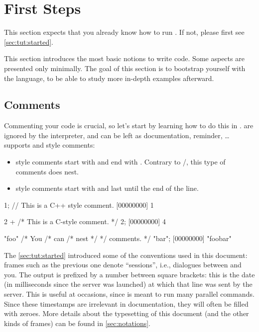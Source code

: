 
\chapter{First Steps}
\label{sec:tut:first}

This section expects that you already know how to run .  If
not, please first see \autoref{sec:tut:started}.

This section introduces the most basic notions to write \us code. Some
aspects are presented only minimally.  The goal of this section is to
bootstrap yourself with the \us language, to be able to study more in-depth
examples afterward.

\section{Comments}

Commenting your code is crucial, so let's start by learning how to do this
in \us.  are ignored by the interpreter, and can be left as
documentation, reminder, \ldots \us supports \langC and \Cxx style comments:

\begin{itemize}
\item \langC style comments start with \textcmt{/*} and end with \textcmt{*/}.
  Contrary to \langC/\Cxx, this type of comments does nest.
\item \Cxx style comments start with \textcmt{//} and last until the end of
  the line.
\end{itemize}

\begin{urbiscript}[firstnumber=1]
1; // This is a C++ style comment.
[00000000] 1

2 + /* This is a C-style comment. */ 2;
[00000000] 4

"foo" /* You /* can /* nest */ */ comments. */ "bar";
[00000000] "foobar"
\end{urbiscript}

The \autoref{sec:tut:started} introduced some of the conventions used in
this document: frames such as the previous one denote ``\us sessions'',
i.e., dialogues between \urbi and you.  The output is prefixed by a number
between square brackets: this is the date (in milliseconds since the server
was launched) at which that line was sent by the server. This is useful at
occasions, since \urbi is meant to run many parallel commands.  Since these
timestamps are irrelevant in documentation, they will often be filled with
zeroes.  More details about the typesetting of this document (and the other
kinds of frames) can be found in \autoref{sec:notations}.

